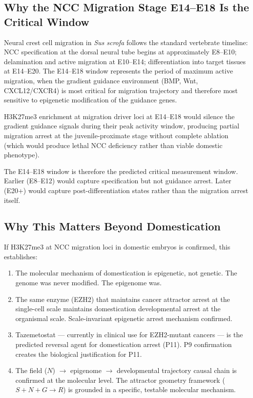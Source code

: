 \documentclass[10pt, a4paper]{article}
\begin{document}
\subsection{Why the NCC Migration Stage
E14--E18 Is the Critical Window}

Neural crest cell migration in \textit{Sus scrofa}
follows the standard vertebrate timeline:
NCC specification at the dorsal neural tube begins
at approximately E8--E10; delamination and active
migration at E10--E14; differentiation into
target tissues at E14--E20. The E14--E18 window
represents the period of maximum active migration,
when the gradient guidance environment (BMP, Wnt,
CXCL12/CXCR4) is most critical for migration
trajectory and therefore most sensitive to
epigenetic modification of the guidance genes.

H3K27me3 enrichment at migration driver loci at
E14--E18 would silence the gradient guidance
signals during their peak activity window,
producing partial migration arrest at the
juvenile-proximate stage without complete
ablation (which would produce lethal NCC deficiency
rather than viable domestic phenotype).

The E14--E18 window is therefore the predicted
critical measurement window. Earlier (E8--E12)
would capture specification but not guidance
arrest. Later (E20+) would capture
post-differentiation states rather than
the migration arrest itself.

\subsection{Why This Matters Beyond Domestication}

If H3K27me3 at NCC migration loci in domestic
embryos is confirmed, this establishes:

\begin{enumerate}[itemsep=0.2em]
  \item The molecular mechanism of domestication
    is epigenetic, not genetic. The genome was
    never modified. The epigenome was.

  \item The same enzyme (EZH2) that maintains
    cancer attractor arrest at the single-cell
    scale maintains domestication developmental
    arrest at the organismal scale. Scale-invariant
    epigenetic arrest mechanism confirmed.

  \item Tazemetostat --- currently in clinical use
    for EZH2-mutant cancers --- is the predicted
    reversal agent for domestication arrest (P11).
    P9 confirmation creates the biological
    justification for P11.

  \item The field ($N$) $\rightarrow$ epigenome
    $\rightarrow$ developmental trajectory
    causal chain is confirmed at the molecular
    level. The attractor geometry framework
    ($S + N + G \rightarrow R$) is grounded in
    a specific, testable molecular mechanism.
\end{enumerate}
\end{document}
